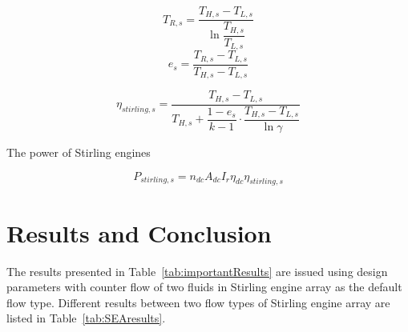 \documentclass{article}
\begin{document}
\begin{equation*}
	T_{R,s}=\dfrac{T_{H,s}-T_{L,s}}{\ln\dfrac{T_{H,s}}{T_{L,s}}}
\end{equation*}
\begin{equation*}
	e_{s}=\dfrac{T_{R,s}-T_{L,s}}{T_{H,s}-T_{L,s}}
\end{equation*}

\begin{equation*}
	\eta_{stirling,s}=\dfrac{T_{H,s}-T_{L,s}}{T_{H,s}+\dfrac{1-e_{s}}{k-1}\cdot\dfrac{T_{H,s}-T_{L,s}}{\ln\gamma}}
\end{equation*}

The power of Stirling engines

\begin{equation*}
	P_{stirling,s}=n_{dc}A_{dc}I_r\eta_{dc}\eta_{stirling,s}
\end{equation*}

\section{Results and Conclusion}

The results presented in Table~\ref{tab:importantResults} are issued using design parameters with counter flow of two fluids in Stirling engine array as the default flow type. Different results between two flow types of Stirling engine array are listed in Table~\ref{tab:SEAresults}.
\end{document}
